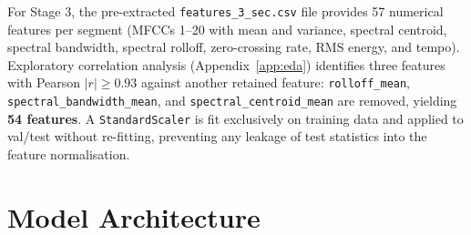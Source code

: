 \documentclass[10pt, twocolumn, a4paper]{article}
\begin{document}
For Stage 3, the pre-extracted \texttt{features\_3\_sec.csv} file provides 57 numerical features per segment (MFCCs 1--20 with mean and variance, spectral centroid, spectral bandwidth, spectral rolloff, zero-crossing rate, RMS energy, and tempo). Exploratory correlation analysis (Appendix~\ref{app:eda}) identifies three features with Pearson $|r|\geq 0.93$ against another retained feature: \texttt{rolloff\_mean}, \texttt{spectral\_\allowbreak bandwidth\_mean}, and \texttt{spectral\_\allowbreak centroid\_mean} are removed, yielding \textbf{54 features}. A \texttt{StandardScaler} is fit exclusively on training data and applied to val/test without re-fitting, preventing any leakage of test statistics into the feature normalisation.

\section{Model Architecture}
\end{document}
